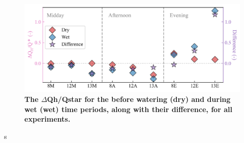 \documentclass[final,3p,times,authoryear]{elsarticle}
\newcommand{\beginsupplement}{%
        \setcounter{table}{0}
        \renewcommand{\thetable}{S\arabic{table}}%
        \setcounter{figure}{0}
        \renewcommand{\thefigure}{S\arabic{figure}}%
     }
\begin{document}

\begin{figure}
\centering
\includegraphics[trim={0 0 0 0},clip,scale=1.0]{pict047.png}
\caption{\bf The $\Delta$\gls{Qh}/\gls{Qstar} for the before watering (dry) and during wet (wet) time periods, along with their difference, for all experiments.}
 \label{fig:7.19}
\end{figure}s


\end{document}
